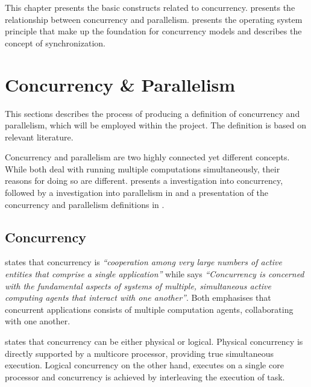 \makeatletter {}\makeatother
{}
This chapter presents the basic constructs related to concurrency.  presents the relationship between concurrency and parallelism.  presents the operating system principle that make up the foundation for concurrency models and  describes the concept of synchronization.
\section{Concurrency \& Parallelism}\label{sec:concurrency_parallelism}
This sections describes the process of producing a definition of concurrency and parallelism, which will be employed within the project. The definition is based on relevant literature.

Concurrency and parallelism are two highly connected yet different concepts. While both deal with running multiple computations simultaneously, their reasons for doing so are different.  presents a investigation into concurrency, followed by a investigation into parallelism in 
 and a presentation of the concurrency and parallelism definitions in .

\subsection{Concurrency}\label{sec:basics_concurrency}
\cite[p. 330]{papadopoulos1998coordination} states that concurrency is \textit{``cooperation among very large numbers of active entities that comprise a single application''} while \cite[p. 607]{cleaveland1996strategic}
says \textit{``Concurrency is concerned with the fundamental aspects of systems of multiple, simultaneous active computing agents that interact with one another''}. Both emphasises that concurrent applications consists of multiple computation agents, collaborating with one another.

\cite[p. 579]{sebestaProLang} states that concurrency can be either physical or logical. Physical concurrency is directly supported by a multicore processor, providing true simultaneous execution. Logical concurrency on the other hand, executes on a single core processor and concurrency is achieved by interleaving the execution of task.

